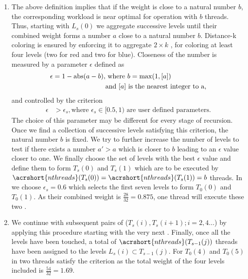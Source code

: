 \begin{enumerate}
	\item The above definition implies that if the weight is close to a natural number $b$, the corresponding workload is near optimal for operation with $b$ threads. Thus, starting with $L_s(0)$ we aggregate successive levels until their combined weight forms a number $a$ close to a natural number $b$. Distance-k coloring is ensured by enforcing it to aggregate \atleast $2 \times k$ \levels, \ie for \DTWO coloring at least four levels (two for red and two for blue). Closeness of the number is measured by a parameter $\epsilon$ defined as
	\begin{align*}
		\epsilon =  1 - \mbox{abs}(a-b), & \text{ where } b= \max(1,[a])\\
				& \text{and } [a] \text{ is the nearest integer to a},
	\end{align*}
	and controlled by the criterion
	\begin{align*}
	\epsilon &> \epsilon_s, \text{where $\epsilon_s \in  [0.5,1)$ are user defined parameters.} 	
	\end{align*}		   
	The choice of this parameter may be different for every stage of recursion. 
	 Once we find a collection of successive levels satisfying this criterion, the natural number $b$ is fixed. We try to further increase the number of levels to test if there exists a number $a'>a$ which is closer to $b$ leading to an $\epsilon$ value closer to one. We finally choose the set of levels with the best $\epsilon$ value and define them to form $T_s(0)$ and $T_s(1)$ which are to be executed by $\acrshort{nthreads}(T_s(0))=\acrshort{nthreads}(T_s(1))=b$ threads.	 
	 In  we choose $\epsilon_s = 0.6$ which selects the first seven levels to form $T_0(0)$ and $T_0(1)$.  As their combined weight is $\frac{28}{32}=0.875$,  one thread will execute these two \levelGroups. 

	\item We continue with subsequent pairs of \levelGroups ($T_s(i), T_s(i+1); i=2,4 ...$) by applying this procedure starting with the very next \level. Finally, once all the levels have been touched, a total of $\acrshort{nthreads}(T_{s-1}(j))$ threads have been assigned to the levels $L_s(i) \subset T_{s-1}(j)$. For $T_0(4)$ and $T_0(5)$  in  two threads satisfy the criterion as the total weight of the four levels included is $\frac{54}{32}=1.69$.
	

\end{enumerate}
